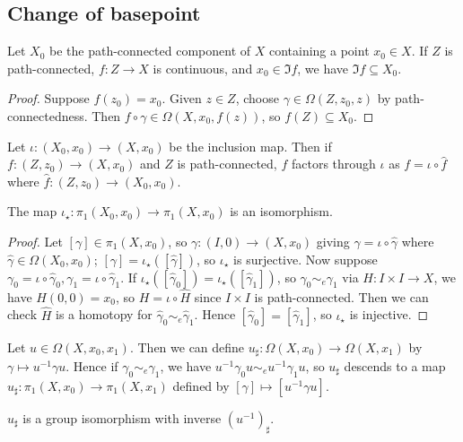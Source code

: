 \subsection{Change of basepoint}
\begin{lemma}
	Let \( X_0 \) be the path-connected component of \( X \) containing a point \( x_0 \in X \).
	If \( Z \) is path-connected, \( f \colon Z \to X \) is continuous, and \( x_0 \in \Im f \), we have \( \Im f \subseteq X_0 \).
\end{lemma}
\begin{proof}
	Suppose \( f(z_0) = x_0 \).
	Given \( z \in Z \), choose \( \gamma \in \Omega(Z,z_0,z) \) by path-connectedness.
	Then \( f \circ \gamma \in \Omega(X,x_0,f(z)) \), so \( f(Z) \subseteq X_0 \).
\end{proof}
Let \( \iota \colon (X_0,x_0) \to (X,x_0) \) be the inclusion map.
Then if \( f \colon (Z,z_0) \to (X,x_0) \) and \( Z \) is path-connected, \( f \) factors through \( \iota \) as \( f = \iota \circ \hat f \) where \( \hat f \colon (Z,z_0) \to (X_0,x_0) \).
\begin{lemma}
	The map \( \iota_\star \colon \pi_1(X_0,x_0) \to \pi_1(X,x_0) \) is an isomorphism.
\end{lemma}
\begin{proof}
	Let \( [\gamma] \in \pi_1(X,x_0) \), so \( \gamma \colon (I,0) \to (X,x_0) \) giving \( \gamma = \iota \circ \hat\gamma \) where \( \hat\gamma \in \Omega(X_0,x_0) \); \( [\gamma] = \iota_\star([\hat\gamma]) \), so \( \iota_\star \) is surjective.
	Now suppose \( \gamma_0 = \iota \circ \hat \gamma_0, \gamma_1 = \iota \circ \hat \gamma_1 \).
	If \( \iota_\star([\hat\gamma_0]) = \iota_\star([\hat\gamma_1]) \), so \( \gamma_0 \sim_e \gamma_1 \) via \( H \colon I \times I \to X \), we have \( H(0,0) = x_0 \), so \( H = \iota \circ \hat H \) since \( I \times I \) is path-connected.
	Then we can check \( \hat H \) is a homotopy for \( \hat \gamma_0 \sim_e \hat \gamma_1 \).
	Hence \( [\hat\gamma_0] = [\hat\gamma_1] \), so \( \iota_\star \) is injective.
\end{proof}
Let \( u \in \Omega(X,x_0,x_1) \).
Then we can define \( u_\sharp \colon \Omega(X,x_0) \to \Omega(X,x_1) \) by \( \gamma \mapsto u^{-1}\gamma u \).
Hence if \( \gamma_0 \sim_e \gamma_1 \), we have \( u^{-1}\gamma_0 u \sim_e u^{-1} \gamma_1 u \), so \( u_\sharp \) descends to a map \( u_\sharp \colon \pi_1(X,x_0) \to \pi_1(X,x_1) \) defined by \( [\gamma] \mapsto [u^{-1}\gamma u] \).
\begin{proposition}
	\( u_\sharp \) is a group isomorphism with inverse \( (u^{-1})_\sharp \).
	\begin{center}
	\end{center}
\end{proposition}
